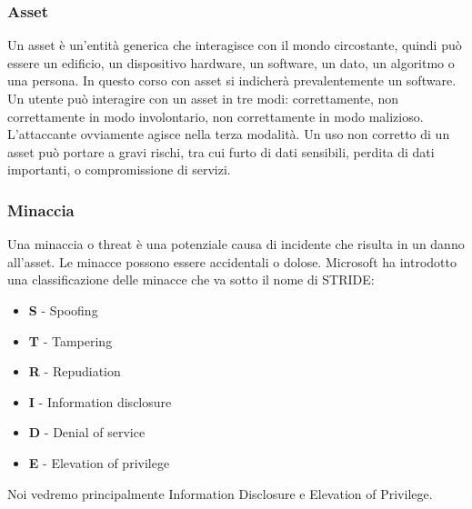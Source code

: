 \subsubsection{Asset}
Un asset è un'entità generica che interagisce con il mondo circostante, quindi può essere un edificio, un dispositivo hardware, un software, un dato, un algoritmo o una persona. In questo corso con asset si indicherà prevalentemente un software. Un utente può interagire con un asset in tre modi: correttamente, non correttamente in modo involontario, non correttamente in modo malizioso. L'attaccante ovviamente agisce nella terza modalità. Un uso non corretto di un asset può portare a gravi rischi, tra cui furto di dati sensibili, perdita di dati importanti, o compromissione di servizi.

\subsubsection{Minaccia}
Una minaccia o threat è una potenziale causa di incidente che risulta in un danno all'asset. Le minacce possono essere accidentali o dolose. Microsoft ha introdotto una classificazione delle minacce che va sotto il nome di STRIDE:
\begin{itemize}
    \item \textbf{S} - Spoofing
    \item \textbf{T} - Tampering
    \item \textbf{R} - Repudiation
    \item \textbf{I} - Information disclosure
    \item \textbf{D} - Denial of service
    \item \textbf{E} - Elevation of privilege
\end{itemize}
Noi vedremo principalmente Information Disclosure e Elevation of Privilege.


